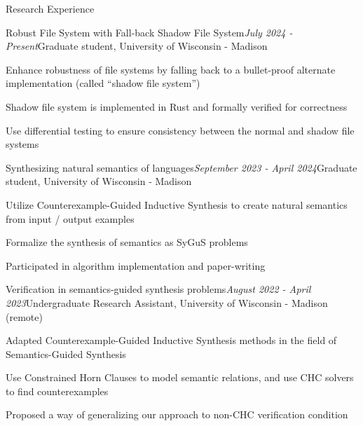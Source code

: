 \documentclass{resume} %
\newcommand{\Apr}{April }
\newcommand{\Jul}{July }
\newcommand{\Aug}{August }
\newcommand{\Sept}{September }
\begin{document}
    
\begin{rSection}{Research Experience}

\begin{rSubsection}{Robust File System with Fall-back Shadow File System}{\em \Jul 2024 - Present}{Graduate student, \textup{University of Wisconsin - Madison}}{}

\item Enhance robustness of file systems by falling back to a bullet-proof alternate implementation (called ``shadow file system'')
\item Shadow file system is implemented in Rust and formally verified for correctness 
\item Use differential testing to ensure consistency between the normal and shadow file systems
\end{rSubsection}

\begin{rSubsection}{Synthesizing natural semantics of languages}{\em \Sept 2023 - \Apr 2024}{Graduate student, \textup{University of Wisconsin - Madison}}{}

\item Utilize Counterexample-Guided Inductive Synthesis to create natural semantics from input / output examples
\item Formalize the synthesis of semantics as SyGuS problems
\item Participated in algorithm implementation and paper-writing

\end{rSubsection}

\begin{rSubsection}{Verification in semantics-guided synthesis problems}{\em \Aug 2022 - \Apr 2023}{Undergraduate Research Assistant, \textup{University of Wisconsin - Madison} (remote)}{}

\item Adapted Counterexample-Guided Inductive Synthesis methods in the field of Semantics-Guided Synthesis
\item Use Constrained Horn Clauses to model semantic relations, and use CHC solvers to find counterexamples
\item Proposed a way of generalizing our approach to non-CHC verification condition

\end{rSubsection}
  

\end{rSection}
\end{document}

